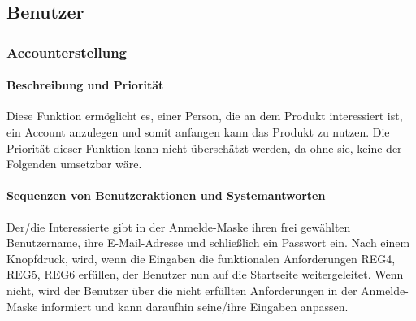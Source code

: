 \subsection{Benutzer}
\subsubsection{Accounterstellung}\label{acc}
\paragraph{Beschreibung und Priorität}
Diese Funktion ermöglicht es, einer Person, die an dem Produkt interessiert ist, ein Account anzulegen und somit anfangen kann das Produkt zu nutzen. Die Priorität dieser Funktion kann nicht überschätzt werden, da ohne sie, keine der Folgenden umsetzbar wäre.
\paragraph{Sequenzen von Benutzeraktionen und Systemantworten} Der/die Interessierte gibt in der Anmelde-Maske ihren frei gewählten Benutzername, ihre E-Mail-Adresse und schließlich ein Passwort ein. Nach einem Knopfdruck, wird, wenn die Eingaben die funktionalen Anforderungen REG4, REG5, REG6 erfüllen, der Benutzer nun auf die Startseite weitergeleitet. Wenn nicht, wird der Benutzer über die nicht erfüllten Anforderungen in der Anmelde-Maske informiert und kann daraufhin seine/ihre Eingaben anpassen.
